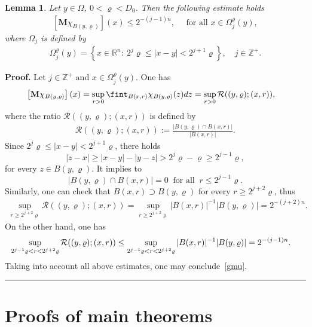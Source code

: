 \documentclass[a4paper, 11pt]{article}
\newtheorem{lemma}[theorem]{Lemma}
\newenvironment{proof}[1][Proof]{\textbf{#1.} }{\hfill\rule{0.5em}{0.5em}}
\begin{document}
\begin{lemma}\label{lem:Mor}
Let $y \in \Omega$, $0<\varrho<D_0$. Then the following estimate holds
\begin{align}\label{gmu}
\left[\mathbf{M}\chi_{B(y,\varrho)}\right](x) \le 2^{-(j-1)n}, \quad \mbox{ for all } x \in \Omega_j^{\varrho}(y),
\end{align}
where $\Omega_j$ is defined by
\begin{align}
\Omega_j^{\varrho}(y) = \left\{x\in \mathbb{R}^n: \ 2^{j}\varrho \le |x-y| < 2^{j+1}\varrho\right\}, \quad j \in \mathbb{Z}^+.\label{Omega-j}
\end{align}
\end{lemma}
\begin{proof}
Let $j \in \mathbb{Z}^+$ and $x \in \Omega_j^{\varrho}(y)$. One has 
\begin{align}\notag
\left[\mathbf{M}\chi_{B(y,\varrho)}\right](x) & = \sup_{r>0} \fint_{B(x,r)} \chi_{B(y,\varrho)}(z) dz =  \sup_{r>0} \mathcal{R}((y,\varrho);(x,r)),
\end{align}
where the ratio $\mathcal{R}((y,\varrho);(x,r))$ is defined by
\begin{align*}
\mathcal{R}((y,\varrho);(x,r)) := \frac{|B(y,\varrho) \cap B(x,r)|}{|B(x,r)|}.
\end{align*}
Since $2^{j}\varrho \le |x - y| < 2^{j+1}\varrho$, there holds 
$$|z - x| \ge |x-y| - |y - z| > 2^j\varrho-\varrho \ge 2^{j-1}\varrho,$$
for every $z \in B(y,\varrho)$. It implies to 
$$|B(y,\varrho)\cap B(x,r)| = 0 \ \mbox{ for all } \ r \le 2^{j-1}\varrho.$$ 
Similarly, one can check that $B(x,r) \supset B(y,\varrho)$ for every $r \ge 2^{j+2}\varrho$, thus
\begin{align*}
\sup_{r \ge 2^{j+2}\varrho} \mathcal{R}((y,\varrho);(x,r)) = \sup_{r \ge 2^{j+2}\varrho} {|B(x,r)|^{-1}} {|B(y,\varrho)|} = 2^{-(j+2)n}. 
\end{align*}
On the other hand, one has
\begin{align}\notag
\sup_{2^{j-1}\varrho < r < 2^{j+2}\varrho} \mathcal{R}((y,\varrho);(x,r)) &\le \sup_{2^{j-1}\varrho < r < 2^{j+2}\varrho} {|B(x,r)|^{-1}} {|B(y,\varrho)|}  = 2^{-(j-1)n}.\notag
\end{align}
Taking into account all above estimates, one may conclude~\eqref{gmu}.
\end{proof}

\section{Proofs of main theorems}
\label{sec:proof}
\end{document}
